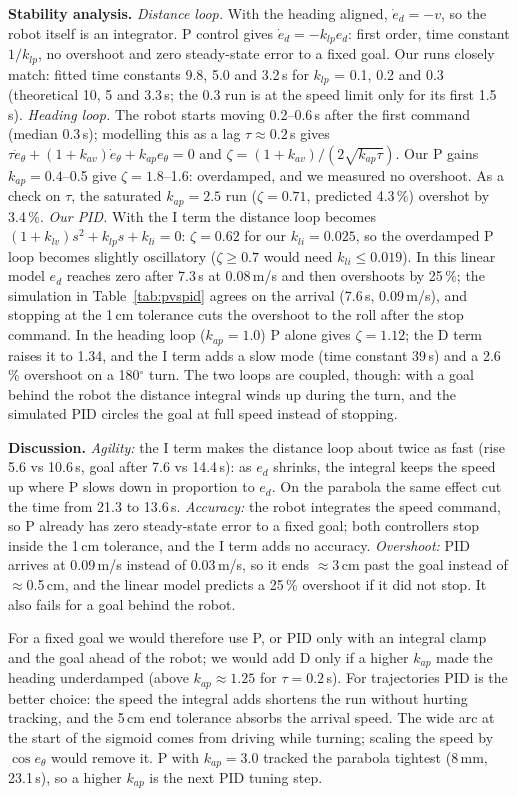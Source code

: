 \documentclass[11pt,twoside,letterpaper]{article}
\newcommand{\para}[1]{\textbf{#1}\quad}
\newcommand{\ed}{e_d}\newcommand{\eh}{e_\theta}
\begin{document}
\para{Stability analysis.}
\textit{Distance loop.} With the heading aligned, $\dot\ed=-v$, so the robot itself is an integrator. P control gives $\dot\ed=-k_{lp}\ed$:
first order, time constant $1/k_{lp}$, no overshoot and zero steady-state error to a fixed goal. Our runs closely match: fitted time
constants 9.8, 5.0 and 3.2\,s for $k_{lp}$ = 0.1, 0.2 and 0.3 (theoretical 10, 5 and 3.3\,s; the 0.3 run is at the speed limit only for
its first 1.5\,s).
\textit{Heading loop.} The robot starts moving 0.2--0.6\,s after the first command (median 0.3\,s); modelling this as a lag
$\tau\approx0.2$\,s gives $\tau\ddot\eh+(1+k_{av})\dot\eh+k_{ap}\eh=0$ and $\zeta=(1+k_{av})/(2\sqrt{k_{ap}\tau})$. Our P gains
$k_{ap}=0.4$--0.5 give $\zeta=1.8$--1.6: overdamped, and we measured no overshoot. As a check on $\tau$, the saturated $k_{ap}=2.5$ run
($\zeta=0.71$, predicted 4.3\,\%) overshot by 3.4\,\%.
\textit{Our PID.} With the I term the distance loop becomes $(1+k_{lv})s^2+k_{lp}s+k_{li}=0$: $\zeta=0.62$ for our $k_{li}=0.025$, so the
overdamped P loop becomes slightly oscillatory ($\zeta\geq0.7$ would need $k_{li}\leq0.019$). In this linear model $\ed$ reaches zero
after 7.3\,s at 0.08\,m/s and then overshoots by 25\,\%; the simulation in Table~\ref{tab:pvspid} agrees on the arrival (7.6\,s,
0.09\,m/s), and stopping at the 1\,cm tolerance cuts the overshoot to the roll after the stop command. In the heading loop
($k_{ap}=1.0$) P alone gives $\zeta=1.12$; the D term raises it to 1.34, and the I term adds a slow mode (time constant 39\,s) and a
2.6\,\% overshoot on a 180$^\circ$ turn. The two loops are coupled, though: with a goal behind the robot the distance integral winds up
during the turn, and the simulated PID circles the goal at full speed instead of stopping.

\para{Discussion.}
\textit{Agility:} the I term makes the distance loop about twice as fast (rise 5.6 vs 10.6\,s, goal after 7.6 vs 14.4\,s): as $\ed$
shrinks, the integral keeps the speed up where P slows down in proportion to $\ed$. On the parabola the same effect cut the time from
21.3 to 13.6\,s.
\textit{Accuracy:} the robot integrates the speed command, so P already has zero steady-state error to a fixed goal; both controllers
stop inside the 1\,cm tolerance, and the I term adds no accuracy.
\textit{Overshoot:} PID arrives at 0.09\,m/s instead of 0.03\,m/s, so it ends $\approx$3\,cm past the goal instead of $\approx$0.5\,cm,
and the linear model predicts a 25\,\% overshoot if it did not stop. It also fails for a goal behind the robot.

For a fixed goal we would therefore use P, or PID only with an integral clamp and the goal ahead of the robot; we would add D only if a
higher $k_{ap}$ made the heading underdamped (above $k_{ap}\approx1.25$ for $\tau=0.2$\,s). For trajectories PID is the better choice:
the speed the integral adds shortens the run without hurting tracking, and the 5\,cm end tolerance absorbs the arrival speed. The wide
arc at the start of the sigmoid comes from driving while turning; scaling the speed by $\cos\eh$ would remove it. P with $k_{ap}=3.0$
tracked the parabola tightest (8\,mm, 23.1\,s), so a higher $k_{ap}$ is the next PID tuning step.
\end{document}
